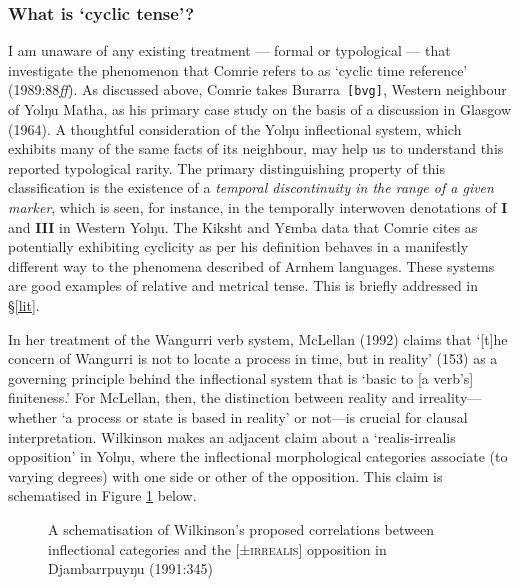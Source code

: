 \documentclass[12pt]{article}
\newcommand{\mcom}[1]
 {\marginpar{\raggedleft\raggedright\hspace{0pt}\linespread{0.9}\footnotesize{#1}}}
\renewcommand{\mcom}[1]{}
\begin{document}
\subsubsection{What is `cyclic tense'?}\label{cyctns}

I am unaware of any existing treatment  --- formal or typological --- that investigate the phenomenon that Comrie refers to as `cyclic time reference' (1989:88\textit{ff}). As discussed above, Comrie takes Burarra~\texttt{[bvg]}, Western neighbour of Yolŋu Matha, as his primary case study on the basis of a discussion in Glasgow (1964). A thoughtful consideration of the Yolŋu inflectional system, which exhibits many of the same facts of its neighbour, may help us to understand this reported typological rarity. The primary distinguishing property of this classification is the existence of a \textit{temporal discontinuity in the range of a given marker}, which is seen, for instance, in the temporally interwoven denotations of \textbf{I} and \textbf{III} in Western Yolŋu. The Kiksht and Yɛmba data that Comrie cites as potentially exhibiting cyclicity as per his definition behaves in a manifestly different way to the phenomena described of Arnhem languages. These systems are good examples of relative and metrical tense. This is briefly addressed in §\ref{lit}.%

In her treatment of the Wangurri verb system, McLellan (1992) claims that `[t]he concern of Wangurri is not to locate a process in time, but in reality' (153) as a governing principle behind the inflectional system that is `basic to [a verb's] finiteness.' For McLellan, then, the distinction between reality and irreality---whether `a process or state is based in reality' or not---is crucial for clausal interpretation. Wilkinson makes an adjacent claim about a `realis-irrealis opposition' in Yolŋu, where the inflectional morphological categories associate (to varying degrees) with one side or other of the opposition. This claim is schematised in Figure \ref{irrealiscorrelations} below.

\begin{figure}[h]\centering\caption{A schematisation of Wilkinson's proposed correlations between inflectional categories and the [±\textsc{irrealis}] opposition in Djambarrpuyŋu (1991:345)}\label{irrealiscorrelations}
\end{figure}
\end{document}

